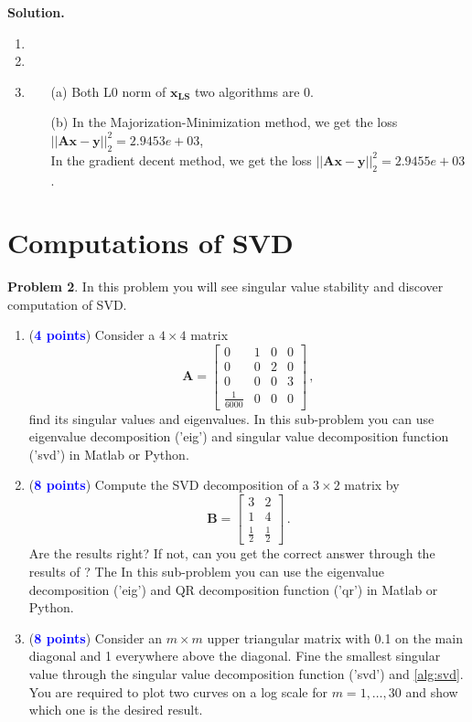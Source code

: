\documentclass[english,onecolumn]{IEEEtran}
\begin{document}
\noindent
\textbf{Solution.}
\begin{enumerate}
	\item
	\item
	\item
	\begin{enumerate}
		\item[(a)] Both L0 norm of $\mathbf{x_{LS}}$ two algorithms are 0.
		\item[(b)] In the Majorization-Minimization method, we get the loss $||\mathbf{Ax-y}||^{2}_{2} = 2.9453e+03$,\\
		In the gradient decent method,  we get the loss $||\mathbf{Ax-y}||^{2}_{2} = 2.9455e+03$.
	\end{enumerate}	
\end{enumerate}

\newpage
\section{Computations of SVD}
\noindent\textbf{Problem 2}.
In this problem you will see singular value stability and discover computation of SVD.
\begin{enumerate}
    \item (\textcolor{blue}{\textbf{4 points}}) Consider a $4 \times 4$ matrix
    \[
	\mathbf{A} = \begin{bmatrix}
		0& 1&0&0 \\
		0&0&2&0\\
		0&0&0&3\\
		\frac{1}{6000}&0&0&0
	\end{bmatrix}\,,
	\]
	find its singular values and eigenvalues. In this sub-problem you can use eigenvalue decomposition ('eig') and singular value decomposition function ('svd') in Matlab or Python.
	\item (\textcolor{blue}{\textbf{8 points}}) Compute the SVD decomposition of a $3 \times 2$ matrix by 
	\[
	\mathbf{B} = \begin{bmatrix}
		3& 2 \\
		1&4  \\
		\frac{1}{2}&\frac{1}{2}
	\end{bmatrix}\,.
	\]
Are the results right? If not, can you get the correct answer through the results of ? The In this sub-problem you can use the eigenvalue decomposition ('eig') and QR decomposition function ('qr') in Matlab or Python.
\item (\textcolor{blue}{\textbf{8 points}}) Consider an $m\times m$ upper triangular matrix with 0.1 on the main diagonal and 1 everywhere above the diagonal. Fine the smallest singular value through the singular value decomposition function ('svd') and \cref{alg:svd}. You are required to plot two curves on a log scale for $m=1,\dots,30$ and show which one is the desired result.
\end{enumerate}
\end{document}
